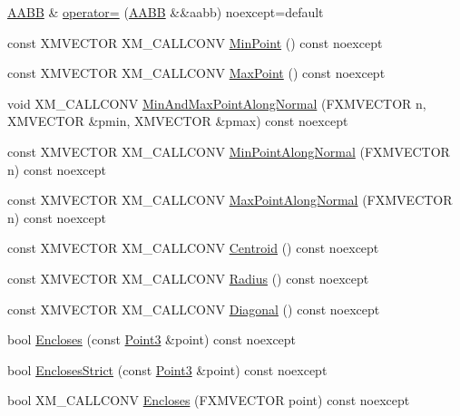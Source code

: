 \begin{DoxyCompactItemize}
\item 
\hyperlink{classmage_1_1_a_a_b_b}{A\+A\+BB} \& \hyperlink{classmage_1_1_a_a_b_b_acc54304ce3bde3ea3aa2b487f2d975b7}{operator=} (\hyperlink{classmage_1_1_a_a_b_b}{A\+A\+BB} \&\&aabb) noexcept=default
\item 
const X\+M\+V\+E\+C\+T\+OR X\+M\+\_\+\+C\+A\+L\+L\+C\+O\+NV \hyperlink{classmage_1_1_a_a_b_b_ad351ed7fe9d7031e4d6eb68f4b4d69eb}{Min\+Point} () const noexcept
\item 
const X\+M\+V\+E\+C\+T\+OR X\+M\+\_\+\+C\+A\+L\+L\+C\+O\+NV \hyperlink{classmage_1_1_a_a_b_b_a98ec13950f8374c0bf6c4958f2203396}{Max\+Point} () const noexcept
\item 
void X\+M\+\_\+\+C\+A\+L\+L\+C\+O\+NV \hyperlink{classmage_1_1_a_a_b_b_ae5f7b990ef079e4ae0484e913f800135}{Min\+And\+Max\+Point\+Along\+Normal} (F\+X\+M\+V\+E\+C\+T\+OR n, X\+M\+V\+E\+C\+T\+OR \&pmin, X\+M\+V\+E\+C\+T\+OR \&pmax) const noexcept
\item 
const X\+M\+V\+E\+C\+T\+OR X\+M\+\_\+\+C\+A\+L\+L\+C\+O\+NV \hyperlink{classmage_1_1_a_a_b_b_a57e7a66ec6e418b2a5367e55b98ef547}{Min\+Point\+Along\+Normal} (F\+X\+M\+V\+E\+C\+T\+OR n) const noexcept
\item 
const X\+M\+V\+E\+C\+T\+OR X\+M\+\_\+\+C\+A\+L\+L\+C\+O\+NV \hyperlink{classmage_1_1_a_a_b_b_a91e0d95d5deaba8c96a36d490ed99a39}{Max\+Point\+Along\+Normal} (F\+X\+M\+V\+E\+C\+T\+OR n) const noexcept
\item 
const X\+M\+V\+E\+C\+T\+OR X\+M\+\_\+\+C\+A\+L\+L\+C\+O\+NV \hyperlink{classmage_1_1_a_a_b_b_a7555db5bea72d1e7ba04931fcbb88aa0}{Centroid} () const noexcept
\item 
const X\+M\+V\+E\+C\+T\+OR X\+M\+\_\+\+C\+A\+L\+L\+C\+O\+NV \hyperlink{classmage_1_1_a_a_b_b_a02d21281c08926f793804fb9f66869b3}{Radius} () const noexcept
\item 
const X\+M\+V\+E\+C\+T\+OR X\+M\+\_\+\+C\+A\+L\+L\+C\+O\+NV \hyperlink{classmage_1_1_a_a_b_b_ad3e011e47a16a9ecb84811296bbbcb1c}{Diagonal} () const noexcept
\item 
bool \hyperlink{classmage_1_1_a_a_b_b_a308fce591178a9aeaed3838dfa32972f}{Encloses} (const \hyperlink{structmage_1_1_point3}{Point3} \&point) const noexcept
\item 
bool \hyperlink{classmage_1_1_a_a_b_b_a0399860c66da2dfc593b6ad5702c7525}{Encloses\+Strict} (const \hyperlink{structmage_1_1_point3}{Point3} \&point) const noexcept
\item 
bool X\+M\+\_\+\+C\+A\+L\+L\+C\+O\+NV \hyperlink{classmage_1_1_a_a_b_b_a97e3f57fc91e4fea04572382c94f4279}{Encloses} (F\+X\+M\+V\+E\+C\+T\+OR point) const noexcept

\end{DoxyCompactItemize}
